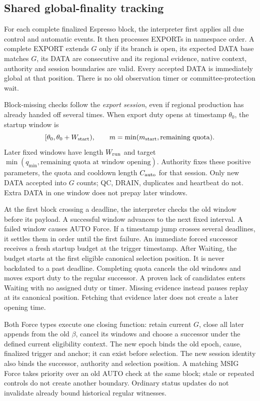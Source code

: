\documentclass[11pt,a4paper]{article}
\begin{document}
\subsection{Shared global-finality tracking}\label{sec:tracker}
For each complete finalized Espresso block, the interpreter first applies
all due control and automatic events. It then processes EXPORTs in
namespace order. A complete EXPORT extends $G$ only if its branch is
open, its expected DATA base matches $G$, its DATA are consecutive and its
regional evidence, native context, authority and session boundaries
are valid. Every accepted DATA is immediately global at that position.
There is no old observation timer or committee-protection wait.

Block-missing checks follow the \emph{export session}, even if regional
production has already handed off several times. When export duty opens
at timestamp $\theta_0$, the startup window is
\[
 [\theta_0,\theta_0+W_{\rm start}),\qquad
 m=\min(m_{\rm start},\text{remaining quota}).
\]
Later fixed windows have length $W_{\rm run}$ and target
$\min(q_{\min},\text{remaining quota at window opening})$.
Authority fixes these positive parameters, the quota and cooldown length
$C_{\rm auto}$ for that session. Only new DATA accepted into $G$ counts;
QC, DRAIN, duplicates and heartbeat do not. Extra DATA in one window
does not prepay later windows.

At the first block crossing a deadline, the interpreter checks the old
window before its payload. A successful window advances to the next
fixed interval. A failed window causes AUTO Force. If a timestamp jump
crosses several deadlines, it settles them in order until the first
failure. An immediate forced successor receives a fresh startup budget
at the trigger timestamp. After Waiting, the budget starts at the first
eligible canonical selection position. It is never backdated to a past
deadline. Completing quota cancels the old windows and moves export duty
to the regular successor. A proven lack of candidates enters Waiting
with no assigned duty or timer. Missing evidence instead pauses replay
at its canonical position. Fetching that evidence later does not create
a later opening time.

Both Force types execute one closing function: retain current $G$,
close all later appends from the old $\beta$, cancel its windows and
choose a successor under the defined current eligibility context.
The new epoch binds the old epoch, cause, finalized trigger and anchor;
it can exist before selection. The new session identity also binds
the successor, authority and selection position. A matching MSIG Force takes priority over an old AUTO check
at the same block; stale or repeated controls do not create another
boundary. Ordinary status updates do not invalidate already bound
historical regular witnesses.
\end{document}
